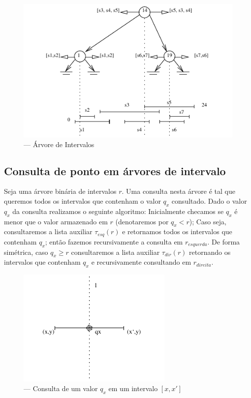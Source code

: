\begin{figure}[h!]
    \begin{center}
        \includegraphics[scale=1.5]{images/interval_tree1.pdf}
    \end{center}
    \caption {— Árvore de Intervalos}
    \label{fig:19}
\end{figure}

\subsection{Consulta de ponto em árvores de intervalo}
Seja uma árvore binária de intervalos $r$. Uma consulta nesta árvore é tal que queremos todos os intervalos que contenham o valor $q_x$ consultado.
Dado o valor $q_x$ da consulta realizamos o seguinte algoritmo: Inicialmente checamos se $q_x$ é menor que o valor armazenado em $r$ (denotaremos por $q_x < r$); Caso seja, consultaremos a lista auxiliar $\tau_{esq}(r)$ e retornamos todos os intervalos que contenham $q_x$; então fazemos recursivamente a consulta em $r_{esquerda}$. De forma simétrica, caso $q_x \geq r $  consultaremos a lista auxiliar $\tau_{dir}(r)$ retornando os intervalos que contenham $q_x$ e recursivamente consultando em $r_{direita}$.

\begin{figure}[h!]
    \begin{center}
        \includegraphics[scale=1.5]{images/interval_tree_query.pdf}
    \end{center}
    \caption{ — Consulta de um valor $q_x$ em um intervalo $[x, x']$}
    \label{fig:20}
\end{figure}


